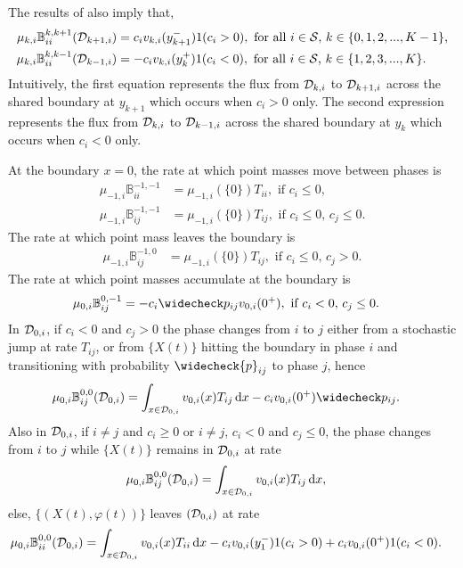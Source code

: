 The results of \cite{bo2014} also imply that,  
\begin{align*}
\mu_{k,i}\mathbb B_{ii}^{k,k+1}(\mathcal{D}_{k+1,i})&= c_iv_{k,i}(y_{k+1}^-) 1{(c_i>0)},\mbox{ for all \(i\in\mathcal{S}\), \(k\in\{0,1,2,...,K-1\}\),}
\\\mu_{k,i}\mathbb B_{ii}^{k,k-1}(\mathcal{D}_{k-1,i})&= -c_iv_{k,i}(y_{k}^+) 1{(c_i<0)}, \mbox{  for all \(i\in\mathcal{S}\), \(k\in\{1,2,3,...,K\}\)}.
\end{align*}
Intuitively, the first equation represents the flux from \(\mathcal{D}_{k,i}\) to \(\mathcal{D}_{k+1,i}\) across the shared boundary at \(y_{k+1}\) which occurs when \(c_i>0\) only. The second expression represents the flux from \(\mathcal{D}_{k,i}\) to \(\mathcal{D}_{k-1,i}\) across the shared boundary at \(y_{k}\) which occurs when \(c_i<0\) only. 

At the boundary \(x=0\), the rate at which point masses move between phases is 
\begin{align*}
	\mu_{-1,i}\mathbb B_{ii}^{{-1},{-1}} &= \mu_{-1,i}(\{0\})T_{ii},\mbox{ if } c_i\leq 0,\,\\
	\mu_{-1,i}\mathbb B_{ij}^{{-1},{-1}} &= \mu_{-1,i}(\{0\})T_{ij},\mbox{ if }c_i\leq 0,\,c_j\leq 0. 
	\end{align*}
	The rate at which point mass leaves the boundary is
	\begin{align*}
	\mu_{-1,i}\mathbb B_{ij}^{{-1},0} &= \mu_{-1,i}(\{0\})T_{ij},\mbox{ if }c_i\leq 0,\,c_j> 0. 
	\end{align*}
	The rate at which point masses accumulate at the boundary is 
	\begin{align*}
	\mu_{0,i}\mathbb B_{ij}^{0,{-1}} &= -c_i\widecheck p_{ij}v_{0,i}(0^+),\mbox{ if }c_i< 0,\,c_j\leq 0.
	\end{align*}
	In \(\mathcal{D}_{0,i}\), if \(c_i<0\) and \(c_j>0\) the phase changes from \(i\) to \(j\) either from a stochastic jump at rate \(T_{ij}\), or from \(\{X(t)\}\) hitting the boundary in phase \(i\) and transitioning with probability \(\widecheck{p}_{ij}\) to phase \(j\), hence
	\begin{align*}
	\mu_{0,i}\mathbb B_{ij}^{0,0}(\calD_{0,i})&=\int_{x\in\calD_{0,i}}v_{0,i}(x)T_{ij}\wrt x - c_iv_{0,i}(0^+)\widecheck p_{ij}.
	\end{align*}
	Also in \(\mathcal{D}_{0,i}\), if \(i\neq j\) and \(c_i\geq 0\) or \(i\neq j\), \(c_i< 0\) and \(c_j\leq 0\), the phase changes from \(i\) to \(j\) while \(\{X(t)\}\) remains in \(\mathcal{D}_{0,i}\) at rate
	\begin{align*}
	\mu_{0,i}\mathbb B_{ij}^{0,0}(\mathcal{D}_{0,i})&=\int_{x\in\mathcal{D}_{0,i}}v_{0,i}(x)T_{ij}\, \mathrm{d} x,
	\end{align*}
	else, \(\{(X(t),\varphi(t))\}\) leaves \((\mathcal{D}_{0,i})\) at rate
	\begin{align*}
	\mu_{0,i}\mathbb B_{ii}^{0,0}(\mathcal{D}_{0,i})&=\int_{x\in\mathcal{D}_{0,i}}v_{0,i}(x)T_{ii}\, \mathrm{d} x - c_iv_{0,i}(y_1^-) 1{(c_i> 0)} + c_iv_{0,i}(0^+)1{(c_i< 0)}.
\end{align*}


